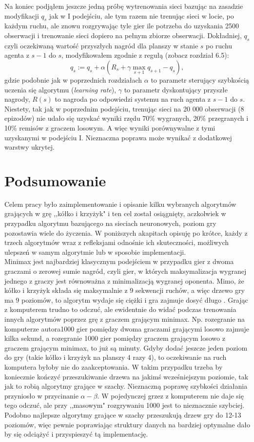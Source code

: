 \documentclass[licencjacka]{pracamgr}
\begin{document}
Na koniec podjąłem jeszcze jedną próbę wytrenowania sieci bazując na zasadzie modyfikacji $q_{s}$ jak w I podejściu, ale tym razem nie trenując sieci w locie, po każdym ruchu, ale znowu rozgrywając tyle gier ile potrzeba do uzyskania 2500 obserwacji i trenowanie sieci dopiero na pełnym zbiorze obserwacji. Dokładniej,  $q_{s}$ czyli oczekiwaną wartość przyszłych nagród dla planszy w stanie $s$ po ruchu agenta z $s-1$ do $s$, modyfikowałem zgodnie z regułą (zobacz \cite{RL} rozdział 6.5):
$$q_{s} := q_{s} + \alpha(R_{s}+\gamma\max_{s+1}q_{s+1}-q_{s}),$$
gdzie podobnie jak w poprzednich rozdziałach $\alpha$ to parametr sterujący szybkością uczenia się algorytmu (\textit{learning rate}), $\gamma$ to parametr dyskontujący przyszłe nagrody, $R(s)$ to nagroda po odpowiedzi systemu na ruch agenta z $s-1$ do $s$. Niestety, tak jak w poprzednim podejściu, trenując sieci na 20 000 obserwacji (8 epizodów) nie udało się uzyskać wyniki rzędu 70\%  wygranych, 20\% przegranych i 10\% remisów z graczem losowym. A więc wyniki porównywalne z tymi uzyskanymi w podejściu I. Nieznaczna poprawa może wynikać z dodatkowej warstwy ukrytej. 
  

\chapter{Podsumowanie}
Celem pracy było zaimplementowanie i opisanie kilku wybranych algorytmów grających w grę ,,kółko i krzyżyk" i ten cel został osiągnięty,  aczkolwiek w przypadku algorytmu bazującego na sieciach neuronowych, poziom gry pozostawia wiele do życzenia.  W poniższych akapitach opisuję po krótce, każdy z trzech algorytmów wraz z refleksjami odnośnie ich skuteczności,  możliwych ulepszeń w samym algorytmie lub w sposobie implementacji.\\

Minimax jest najbardziej klasycznym podejściem w przypadku gier z dwoma graczami o zerowej sumie nagród,  czyli gier, w których maksymalizacja wygranej jednego z graczy jest równoważna z minimalizacją wygranej oponenta.   Mimo, że kółko i krzyżyk składa się maksymalnie z 9 sekwencji ruchów, a więc drzewo gry ma 9 poziomów, to algorytm wydaje się ciężki i gra zajmuje dosyć długo . Grając z komputerem trudno to odczuć, ale ewidentnie do widać podczas trenowania innych algorytmów poprzez grę z graczem grającym minimax. Np. rozegranie na komputerze autora1000 gier pomiędzy dwoma graczami grającymi losowo zajmuje kilka sekund, a rozegranie 1000 gier pomiędzy graczem grającym losowo z graczem grającym minimax, to już są minuty. Gdyby dodać jeszcze jeden poziom do gry (takie kółko i krzyżyk na planszy 4 razy 4), to oczekiwanie na ruch komputera byłoby nie do zaakceptowania. W takim przypadku trzeba by koniecznie kończyć przeszukiwanie drzewa na jakimś wcześniejszym poziomie, tak jak to robią algorytmy grające w szachy.  Nieznaczną poprawę szybkości działania przyniosło w przycinanie $\alpha-\beta$. W pojedynczej grzez z komputerem nie daje się tego odczuć, ale przy ,,masowym" rozgrywaniu 1000 jest to nieznacznie szybciej. Podobno najlepsze algorytmy grające w szachy przeszukują drzew gry do 12-13 poziomów, więc pewnie poprawiając struktury danych na bardziej optymalne dało by się odciążyć i przyspieszyć tą implementację.\\
\end{document}
